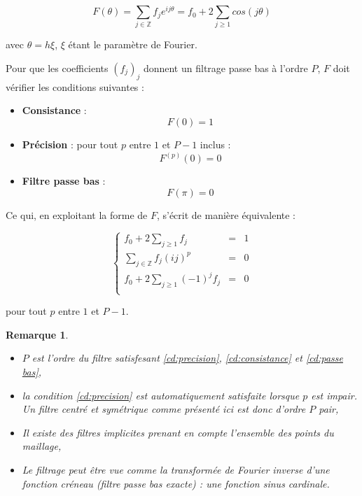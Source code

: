 \documentclass[10pt,a4paper]{article}
\newtheorem{remarque}{Remarque}
\begin{document}
\begin{equation}
F(\theta) = \sum_{j \in \mathbb{Z}} f_j e^{ij \theta} = f_0 + 2 \sum_{j \geq 1} cos ( j \theta )
\label{eq:ampli}
\end{equation}

avec $\theta = h \xi$, $\xi$ étant le paramètre de Fourier.

Pour que les coefficients $(f_j)_j$ donnent un filtrage passe bas à l'ordre $P$, $F$ doit vérifier les conditions suivantes :

\begin{itemize}
\item \textbf{Consistance} :
\begin{equation}
F(0) = 1
\label{cd:consistance}
\end{equation}

\item \textbf{Précision} : pour tout $p$ entre $1$ et $P-1$ inclus :
\begin{equation}
F^{(p)}(0) = 0
\label{cd:precision}
\end{equation}

\item \textbf{Filtre passe bas} : 
\begin{equation}
F(\pi) = 0
\label{cd:passe bas}
\end{equation}
\end{itemize}

Ce qui, en exploitant la forme de $F$, s'écrit de manière équivalente :

\begin{equation}
\left\lbrace
\begin{matrix}
f_0 + 2 \sum_{j \geq 1} f_j & = & 1 \\
\sum_{j\in\mathbb{Z}} f_j (ij)^p & = & 0 \\
f_0 + 2 \sum_{j \geq 1} (-1)^j f_j & = & 0 \\
\end{matrix}
\right.
\end{equation}

pour tout $p$ entre $1$ et $P-1$.

\begin{remarque}
\begin{itemize}
\item $P$ est l'ordre du filtre satisfesant \eqref{cd:precision}, \eqref{cd:consistance} et \eqref{cd:passe bas},
\item la condition \eqref{cd:precision} est automatiquement satisfaite lorsque $p$ est impair. Un filtre centré et symétrique comme présenté ici est donc d'ordre $P$ pair,
\item Il existe des filtres implicites \cite{VG2002} prenant en compte l'ensemble des points du maillage,
\item Le filtrage peut être vue comme la transformée de Fourier inverse d'une fonction créneau (filtre passe bas exacte) : une fonction sinus cardinale.
\end{itemize}
\end{remarque}
\end{document}
